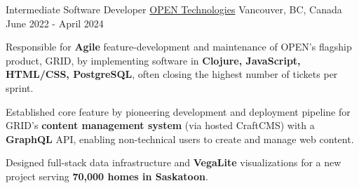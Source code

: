 \begin{cventries}
  \cventry
    {Intermediate Software Developer}
    {\href{https://opentech.eco/}{OPEN Technologies}}
    {Vancouver, BC, Canada}
    {June 2022 - April 2024}
    {
      \begin{cvitems}
            \item Responsible for \textbf{Agile} feature-development and maintenance of OPEN's flagship product, GRID, by implementing software in \textbf{Clojure, JavaScript, HTML/CSS, PostgreSQL}, often closing the highest number of tickets per sprint.
            \item Established core feature by pioneering development and deployment pipeline for GRID's {\textbf{content management system} (via hosted CraftCMS)} with a \textbf{GraphQL} API, enabling non-technical users to create and manage web content.
            \item Designed full-stack data infrastructure and \textbf{VegaLite} visualizations for a new project serving \textbf{70,000 homes in Saskatoon}.
      \end{cvitems}
    }

\end{cventries}

